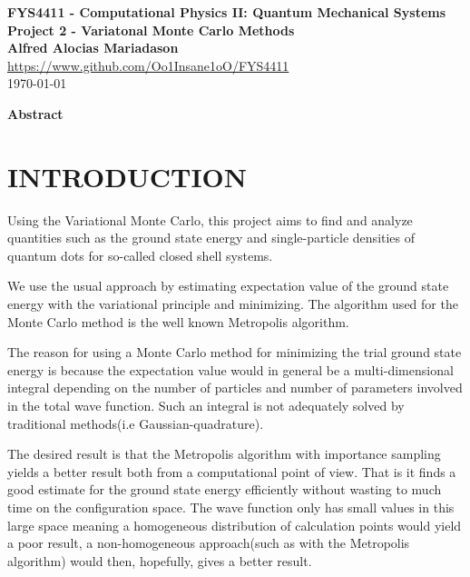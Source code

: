 \documentclass[a4paper, hidelinks, 10pt]{article}
\newcommand{\mdate}{\today}
\newcommand{\mtitle}{FYS4411}
\newcommand{\mauthor}{Alfred Alocias Mariadason}
\newcommand{\massignn}{Project 2}
\let\oldsection\section
\renewcommand{\section}[1]{\centering \oldsection{{#1}} \justifying}
\begin{document}
\thispagestyle{empty}
\begin{center} \vspace{1cm}
    \textbf{\Large{\mtitle\hspace{0.01pt} - Computational Physics II: Quantum
    Mechanical Systems}}\\ \vspace{0.5cm}
    \textbf{\large{\massignn\hspace{0.01pt} - Variatonal Monte Carlo
    Methods}}\\ \vspace{1cm}
    \textbf{\large{\mauthor}}\\ \vspace{0.5cm}
    \large{\url{https://www.github.com/Oo1Insane1oO/FYS4411}} \\ \vspace{0.5cm}
    \Large{\mdate}\\ \vfill
\end{center}

\clearpage
\setcounter{page}{1}

\begin{center}
    \textbf{Abstract} \\
\end{center}

\section{INTRODUCTION}
\label{sec:introduction}
    Using the Variational Monte Carlo, this project aims to find and analyze
    quantities such as the ground state energy and single-particle densities of
    quantum dots for so-called closed shell systems.

    We use the usual approach by estimating expectation value of the ground
    state energy with the variational principle and minimizing. The algorithm
    used for the Monte Carlo method is the well known Metropolis algorithm.

    The reason for using a Monte Carlo method for minimizing the trial ground
    state energy is because the expectation value would in general be a
    multi-dimensional integral depending on the number of particles and number
    of parameters involved in the total wave function. Such an integral is not
    adequately solved by traditional methods(i.e Gaussian-quadrature).

    The desired result is that the Metropolis algorithm with importance
    sampling yields a better result both from a computational point of view.
    That is it finds a good estimate for the ground state energy efficiently
    without wasting to much time on the configuration space. The wave function
    only has small values in this large space meaning a homogeneous
    distribution of calculation points would yield a poor result, a
    non-homogeneous approach(such as with the Metropolis algorithm) would then,
    hopefully, gives a better result.
\end{document}
